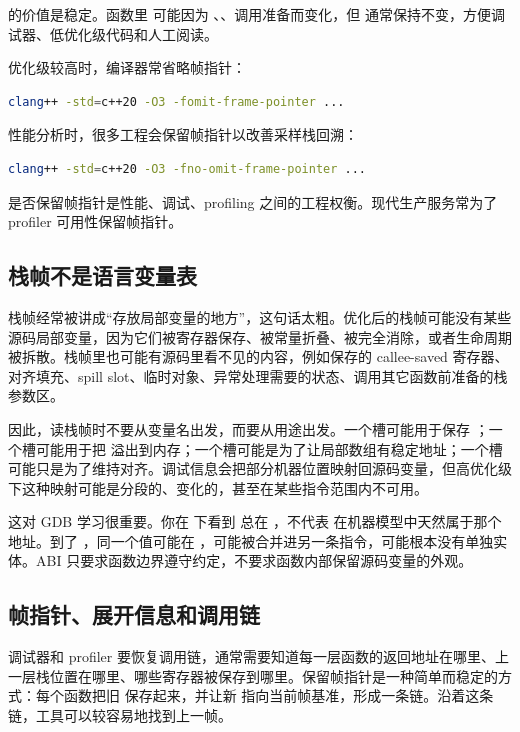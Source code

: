  的价值是稳定。函数里  可能因为 、、调用准备而变化，但  通常保持不变，方便调试器、低优化级代码和人工阅读。

优化级较高时，编译器常省略帧指针：

\begin{lstlisting}[language=bash]
clang++ -std=c++20 -O3 -fomit-frame-pointer ...
\end{lstlisting}

性能分析时，很多工程会保留帧指针以改善采样栈回溯：

\begin{lstlisting}[language=bash]
clang++ -std=c++20 -O3 -fno-omit-frame-pointer ...
\end{lstlisting}

是否保留帧指针是性能、调试、profiling 之间的工程权衡。现代生产服务常为了 profiler 可用性保留帧指针。

\subsection{栈帧不是语言变量表}

栈帧经常被讲成“存放局部变量的地方”，这句话太粗。优化后的栈帧可能没有某些源码局部变量，因为它们被寄存器保存、被常量折叠、被完全消除，或者生命周期被拆散。栈帧里也可能有源码里看不见的内容，例如保存的 callee-saved 寄存器、对齐填充、spill slot、临时对象、异常处理需要的状态、调用其它函数前准备的栈参数区。

因此，读栈帧时不要从变量名出发，而要从用途出发。一个槽可能用于保存 ；一个槽可能用于把  溢出到内存；一个槽可能是为了让局部数组有稳定地址；一个槽可能只是为了维持对齐。调试信息会把部分机器位置映射回源码变量，但高优化级下这种映射可能是分段的、变化的，甚至在某些指令范围内不可用。

这对 GDB 学习很重要。你在  下看到  总在 \code{[rbp - 4]}，不代表  在机器模型中天然属于那个地址。到了 ，同一个值可能在 ，可能被合并进另一条指令，可能根本没有单独实体。ABI 只要求函数边界遵守约定，不要求函数内部保留源码变量的外观。

\subsection{帧指针、展开信息和调用链}

调试器和 profiler 要恢复调用链，通常需要知道每一层函数的返回地址在哪里、上一层栈位置在哪里、哪些寄存器被保存到哪里。保留帧指针是一种简单而稳定的方式：每个函数把旧  保存起来，并让新  指向当前帧基准，形成一条链。沿着这条链，工具可以较容易地找到上一帧。

